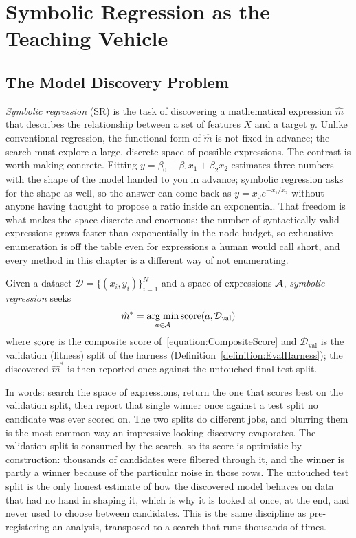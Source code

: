 \section{Symbolic Regression as the Teaching Vehicle}
\label{section:SymbolicRegression}

\subsection{The Model Discovery Problem}

\emph{Symbolic regression} (SR) is the task of discovering a mathematical expression $\hat{m}$ that describes the relationship between a set of features $X$ and a target $y$.
Unlike conventional regression, the functional form of $\hat{m}$ is not fixed in advance; the search must explore a large, discrete space of possible expressions.
The contrast is worth making concrete.
Fitting $y = \beta_0 + \beta_1 x_1 + \beta_2 x_2$ estimates three numbers with the shape of the model handed to you in advance; symbolic regression asks for the shape as well, so the answer can come back as $y = x_0 e^{-x_1 / x_2}$ without anyone having thought to propose a ratio inside an exponential.
That freedom is what makes the space discrete and enormous: the number of syntactically valid expressions grows faster than exponentially in the node budget, so exhaustive enumeration is off the table even for expressions a human would call short, and every method in this chapter is a different way of not enumerating.

\begin{definition}
\label{definition:SymbolicRegression}
Given a dataset $\mathcal{D} = \{(x_i, y_i)\}_{i=1}^{N}$ and a space of expressions $\mathcal{A}$, \emph{symbolic regression} seeks
\begin{equation}
\hat{m}^* = \operatorname*{arg\;min}_{a \in \mathcal{A}} \mathrm{score}(a, \mathcal{D}_{\mathrm{val}})
\end{equation}
where $\mathrm{score}$ is the composite score of~\eqref{equation:CompositeScore} and $\mathcal{D}_{\mathrm{val}}$ is the validation (fitness) split of the harness (Definition~\ref{definition:EvalHarness}); the discovered $\hat{m}^*$ is then reported once against the untouched final-test split.
\end{definition}

In words: search the space of expressions, return the one that scores best on the validation split, then report that single winner once against a test split no candidate was ever scored on.
The two splits do different jobs, and blurring them is the most common way an impressive-looking discovery evaporates.
The validation split is consumed by the search, so its score is optimistic by construction: thousands of candidates were filtered through it, and the winner is partly a winner because of the particular noise in those rows.
The untouched test split is the only honest estimate of how the discovered model behaves on data that had no hand in shaping it, which is why it is looked at once, at the end, and never used to choose between candidates.
This is the same discipline as pre-registering an analysis, transposed to a search that runs thousands of times.


